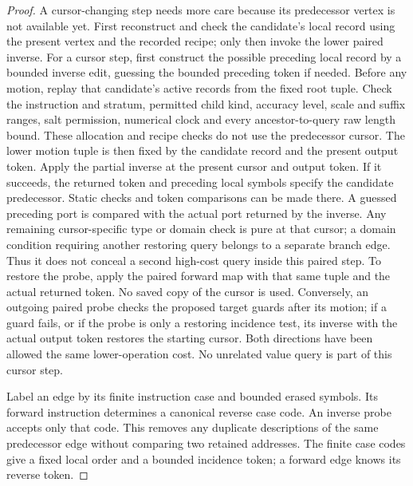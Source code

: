 \documentclass[11pt]{article}
\numberwithin{equation}{section}
\theoremstyle{definition}
\theoremstyle{remark}
\begin{document}
\begin{proof}
A cursor-changing step needs more care because its predecessor vertex is not available yet. First reconstruct and check the candidate's local record using the present vertex and the recorded recipe; only then invoke the lower paired inverse. For a cursor step, first construct the possible preceding local record
by a bounded inverse edit, guessing the bounded preceding token if
needed.  Before any motion, replay that candidate's active records from
the fixed root tuple.  Check the instruction and stratum, permitted
child kind, accuracy level, scale and suffix ranges, salt permission, numerical
clock and every ancestor-to-query raw length bound.  These allocation
and recipe checks do not use the predecessor cursor.  The lower motion
tuple is then fixed by the candidate record and the present output
token.  Apply the partial inverse at the present cursor
and output token.  If it succeeds, the returned token and preceding
local symbols specify the candidate predecessor.  Static checks and
token comparisons can be made there.
A guessed preceding port is compared with the actual port returned by
the inverse.  Any remaining cursor-specific type or domain check is
pure at that cursor; a domain condition requiring another restoring
query belongs to a separate branch edge.  Thus it does not conceal a
second high-cost query inside this paired step.
To restore the probe, apply the
paired forward map with that same tuple and the actual returned token.
No saved copy of the cursor is used.  Conversely, an outgoing paired
probe checks the proposed target guards after its motion; if a guard
fails, or if the probe is only a restoring incidence test, its inverse
with the actual output token restores the starting cursor.  Both
directions have been allowed
the same lower-operation cost.  No unrelated value query is part of
this cursor step.

Label an edge by its finite instruction case and bounded erased
symbols.  Its forward instruction determines a canonical reverse case
code.  An inverse probe accepts only that code.  This removes any
duplicate descriptions of the same predecessor edge without comparing
two retained addresses.  The finite case codes give a fixed local order
and a bounded incidence token; a forward edge knows its reverse token.


\end{proof}
\end{document}
